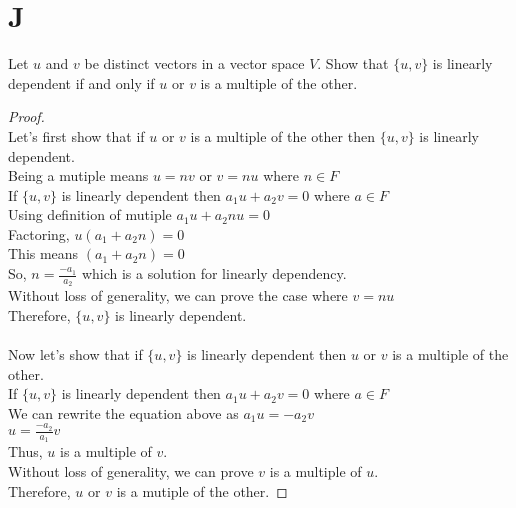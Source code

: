 \documentclass[11pt]{scrartcl}
\begin{document}
\section{J}
Let $u$ and $v$ be distinct vectors in a vector space $V$. Show that $\{u,v\}$ is linearly dependent if and only if $u$ or $v$ is a
multiple of the other.

\begin{proof}
\-\\
	Let's first show that if $u$ or $v$ is a multiple of the other then $\{u,v\}$ is linearly dependent.\\
	Being a mutiple means $u = nv$ or $v = nu$ where $n \in F$ \\
	If $\{u,v\}$ is linearly dependent then $a_1u + a_2v = 0$ where $a \in F$\\
	Using definition of mutiple $a_1u + a_2nu = 0$\\
	Factoring, $u(a_1 + a_2n) = 0$\\
	This means $(a_1 + a_2n) = 0$\\	
	So, $n = \frac{-a_1}{a_2}$ which is a solution for linearly dependency.\\
	Without loss of generality, we can prove the case where $ v = nu$\\
	Therefore, $\{u,v\}$ is linearly dependent.\\
	\-\\
	Now let's show that if $\{u,v\}$ is linearly dependent then $u$ or $v$ is a multiple of the other.\\
	If $\{u,v\}$ is linearly dependent then $a_1u + a_2v = 0$ where $a \in F$\\
	We can rewrite the equation above as $a_1u = -a_2v$\\
	$u = \frac{-a_2}{a_1}v$\\
	Thus, $u$ is a multiple of $v$.\\
	Without loss of generality, we can prove $v$ is a multiple of $u$.\\
	Therefore, $u$ or $v$ is a mutiple of the other.
\end{proof}
\end{document}
